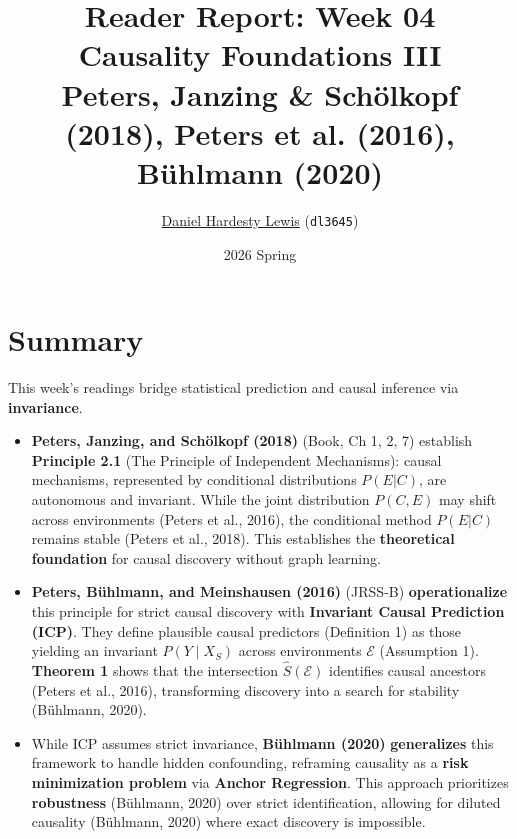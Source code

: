 \documentclass[11pt]{article}
\title{\vspace{-2.5em}\textbf{Reader Report: Week 04} \\ \vspace{0.1em} \large Causality Foundations III \\ \footnotesize Peters, Janzing \& Schölkopf (2018), Peters et al. (2016), Bühlmann (2020)}
\author{\href{https://github.com/dhardestylewis}{Daniel Hardesty Lewis} (\texttt{dl3645})}
\date{2026 Spring}
\begin{document}
\maketitle
\thispagestyle{fancy}
\vspace{-1em}

\section*{Summary}
This week's readings bridge statistical prediction and causal inference via \textbf{invariance}.
\begin{itemize}
    \item \textbf{Peters, Janzing, and Schölkopf (2018)} (Book, Ch 1, 2, 7) establish \textbf{Principle 2.1} (The Principle of Independent Mechanisms): causal mechanisms, represented by conditional distributions $P(E|C)$, are autonomous and invariant.
    While the joint distribution $P(C, E)$ may shift across environments (Peters et al., 2016),
    the conditional method $P(E|C)$ remains stable (Peters et al., 2018).
    This establishes the \textbf{theoretical foundation} for causal discovery without graph learning.
    \item \textbf{Peters, Bühlmann, and Meinshausen (2016)} (JRSS-B) \textbf{operationalize} this principle for strict causal discovery with \textbf{Invariant Causal Prediction (ICP)}.
    They define plausible causal predictors (Definition 1) as those yielding an invariant $P(Y \mid X_S)$ across environments $\mathcal{E}$ (Assumption 1).
    \textbf{Theorem 1} shows that the intersection $\hat{S}(\mathcal{E})$ identifies causal ancestors (Peters et al., 2016), transforming discovery into a search for stability (Bühlmann, 2020).
    \item While ICP assumes strict invariance, \textbf{Bühlmann (2020)} \textbf{generalizes} this framework to handle hidden confounding, reframing causality as a \textbf{risk minimization problem} via \textbf{Anchor Regression}. This approach prioritizes \textbf{robustness} (Bühlmann, 2020) %
    over strict identification, allowing for diluted causality (Bühlmann, 2020) %
    where exact discovery is impossible.
\end{itemize}
\end{document}
